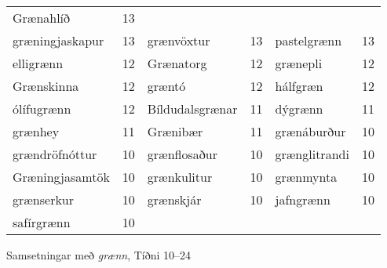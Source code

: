 \documentclass[../samsetningasafn.tex]{subfiles}
\begin{document}
\begin{wordlist}[H]
\begin{tcolorbox}
\begin{tabular}{BlBlBl}
		Grænahlíð		& 13		\\ 	
		græningjaskapur 	& 13		& 
		grænvöxtur		& 13		& 	
		pastelgrænn		& 13		\\ 	
		elligrænn		& 12		& 	
		Grænatorg		& 12		& 	
		grænepli			& 12		\\ 	
		Grænskinna		& 12		& 	
		græntó			& 12		& 	
		hálfgræn		& 12		\\ 	
		ólífugrænn		& 12		& 	
		Bíldudalsgrænar	& 11		& 	
		dýgrænn		& 11		\\ 
		grænhey			& 11		& 	
		Grænibær		& 11		& 	
		grænáburður		& 10		\\ 	
		grændröfnóttur 	& 10		& 	
		grænflosaður		& 10		& 	
		grænglitrandi	& 10		\\ 
		Græningjasamtök & 10		& 	
		grænkulitur		& 10		& 	
		grænmynta		& 10		\\ 	
		grænserkur		& 10		& 	
		grænskjár		& 10		& 	
		jafngrænn		& 10		\\ 	
		safírgrænn		& 10		& 	
						&			&
						&
	\end{tabular}

\end{tcolorbox}
	\caption{Samsetningar með \textit{grænn}, Tíðni 10--24}
	\label{listi:graent.10}
\end{wordlist}
\end{document}
